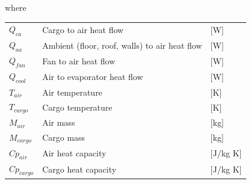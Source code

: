 where
\begin{center}
	\begin{tabular}{l p{8cm} l}
		$Q_{ca}$     & Cargo to air heat flow                        & [\si{W}]                \\
		$Q_{aa}$     & Ambient (floor, roof, walls) to air heat flow & [\si{W}]                \\
		$Q_{fan}$    & Fan to air heat flow                          & [\si{W}]                \\
		$Q_{cool}$   & Air to evaporator heat flow                   & [\si{W}]                \\
		$T_{air}$    & Air temperature                               & [\si{K}]                \\
		$T_{cargo}$  & Cargo temperature                             & [\si{K}]                \\
		$M_{air}$    & Air mass                                      & [\si{kg}]               \\
		$M_{cargo}$  & Cargo mass                                    & [\si{kg}]               \\
		$Cp_{air}$   & Air heat capacity                             & [\si{J}/\si{kg} \si{K}] \\
		$Cp_{cargo}$ & Cargo heat capacity                           & [\si{J}/\si{kg} \si{K}]
	\end{tabular}
\end{center}


